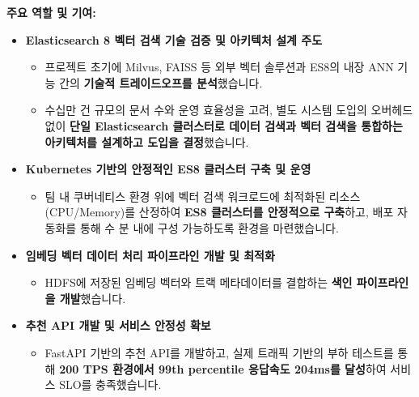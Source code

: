 \documentclass[letterpaper,11pt]{article}
\begin{document}
{{          %
          \textbf{주요 역할 및 기여:}
          \begin{itemize}[leftmargin=*]
              \item \textbf{Elasticsearch 8 벡터 검색 기술 검증 및 아키텍처 설계 주도}
                  \begin{itemize}[leftmargin=*, label=$\circ$]
                      \item 프로젝트 초기에 Milvus, FAISS 등 외부 벡터 솔루션과 ES8의 내장 ANN 기능 간의 \textbf{기술적 트레이드오프를 분석}했습니다.
                      \item 수십만 건 규모의 문서 수와 운영 효율성을 고려, 별도 시스템 도입의 오버헤드 없이 \textbf{단일 Elasticsearch 클러스터로 데이터 검색과 벡터 검색을 통합하는 아키텍처를 설계하고 도입을 결정}했습니다.
                  \end{itemize}

              \item \textbf{Kubernetes 기반의 안정적인 ES8 클러스터 구축 및 운영}
                  \begin{itemize}[leftmargin=*, label=$\circ$]
                      \item 팀 내 쿠버네티스 환경 위에 벡터 검색 워크로드에 최적화된 리소스(CPU/Memory)를 산정하여 \textbf{ES8 클러스터를 안정적으로 구축}하고, 배포 자동화를 통해 수 분 내에 구성 가능하도록 환경을 마련했습니다.
                  \end{itemize}
                  
              \item \textbf{임베딩 벡터 데이터 처리 파이프라인 개발 및 최적화}
                  \begin{itemize}[leftmargin=*, label=$\circ$]
                      \item HDFS에 저장된 임베딩 벡터와 트랙 메타데이터를 결합하는 \textbf{색인 파이프라인을 개발}했습니다.
                  \end{itemize}

              \item \textbf{추천 API 개발 및 서비스 안정성 확보}
                  \begin{itemize}[leftmargin=*, label=$\circ$]
                      \item FastAPI 기반의 추천 API를 개발하고, 실제 트래픽 기반의 부하 테스트를 통해 \textbf{200 TPS 환경에서 99th percentile 응답속도 204ms를 달성}하여 서비스 SLO를 충족했습니다.
                  \end{itemize}
          \end{itemize}

}}
\end{document}
